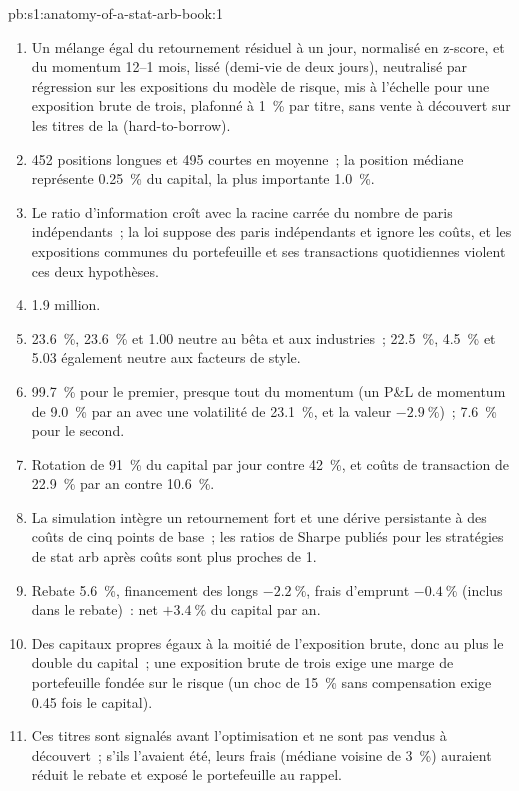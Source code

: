 \begin{solution}{pb:s1:anatomy-of-a-stat-arb-book:1}
\begin{enumerate}
\item Un mélange égal du retournement résiduel à un jour, normalisé en z-score, et du momentum 12--1 mois, lissé (demi-vie de deux jours), neutralisé par régression sur les
expositions du modèle de risque, mis à l'échelle pour une exposition brute de trois, plafonné à 1~\% par titre, sans vente à découvert sur les titres de la  (hard-to-borrow).
\item 452 positions longues et 495 courtes en moyenne~; la position médiane représente 0.25~\% du capital, la plus importante 1.0~\%.
\item Le ratio d'information croît avec la racine carrée du nombre de paris indépendants~; la loi suppose des paris indépendants et ignore les coûts, et les expositions
communes du portefeuille et ses transactions quotidiennes violent ces deux hypothèses.
\item 1.9 million.
\item 23.6~\%, 23.6~\% et 1.00 neutre au bêta et aux industries~; 22.5~\%, 4.5~\% et 5.03 également neutre aux facteurs de style.
\item 99.7~\% pour le premier, presque tout du momentum (un P\&L de momentum de 9.0~\% par an avec une volatilité de 23.1~\%, et la valeur $-2.9~\%$)~; 7.6~\% pour le second.
\item Rotation de 91~\% du capital par jour contre 42~\%, et coûts de transaction de 22.9~\% par an contre 10.6~\%.
\item La simulation intègre un retournement fort et une dérive persistante à des coûts de cinq points de base~; les ratios de Sharpe publiés pour les stratégies de stat arb après coûts sont plus proches de 1.
\item Rebate 5.6~\%, financement des longs $-2.2~\%$, frais d'emprunt $-0.4~\%$ (inclus dans le rebate)~: net $+3.4~\%$ du capital par an.
\item Des capitaux propres égaux à la moitié de l'exposition brute, donc au plus le double du capital~; une exposition brute de trois exige une marge de portefeuille fondée sur le risque (un choc de 15~\% sans compensation exige
0.45 fois le capital).
\item Ces titres sont signalés avant l'optimisation et ne sont pas vendus à découvert~; s'ils l'avaient été, leurs frais (médiane voisine de 3~\%) auraient réduit le rebate et exposé le portefeuille au rappel.

\end{enumerate}
\end{solution}
